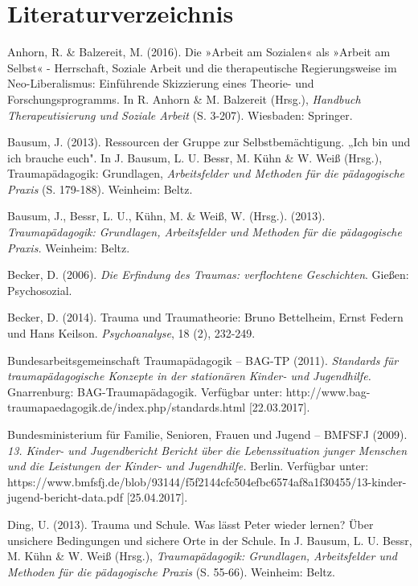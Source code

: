 \section{Literaturverzeichnis}

\setlength{\parindent}{0pt}
\hang
Anhorn, R. \& Balzereit, M. (2016). Die »Arbeit am Sozialen« als »Arbeit am Selbst« - Herrschaft, Soziale Arbeit und die therapeutische Regierungsweise im Neo-Liberalismus: Einf{\"u}hrende Skizzierung eines Theorie- und Forschungsprogramms. In R. Anhorn \& M. Balzereit (Hrsg.), \textit{Handbuch Therapeutisierung und Soziale Arbeit} (S. 3-207). Wiesbaden: Springer.

\hang
Bausum, J. (2013). Ressourcen der Gruppe zur Selbstbem{\"a}chtigung. „Ich bin und ich brauche euch". In J. Bausum, L. U. Bessr, M. Kühn \& W. Weiß (Hrsg.), Traumapädagogik: Grundlagen, \textit{Arbeitsfelder und Methoden für die pädagogische Praxis} (S. 179-188). Weinheim: Beltz.

\hang
Bausum, J., Bessr, L. U., Kühn, M. \& Weiß, W. (Hrsg.). (2013). \textit{Traumapädagogik: Grundlagen, Arbeitsfelder und Methoden für die pädagogische Praxis.} Weinheim: Beltz.

\hang
Becker, D. (2006). \textit{Die Erfindung des Traumas: verflochtene Geschichten}. Gießen: Psychosozial.

\hang
Becker, D. (2014). Trauma und Traumatheorie: Bruno Bettelheim, Ernst Federn und Hans Keilson. \textit{Psychoanalyse}, 18 (2), 232-249.

\hang
Bundesarbeitsgemeinschaft Traumap{\"a}dagogik – BAG-TP (2011). \textit{Standards für traumapädagogische Konzepte in der stationären Kinder- und Jugendhilfe.} Gnarrenburg: BAG-Traumapädagogik. Verfügbar unter: http://www.bag-traumapaedagogik.de/index.php/standards.html [22.03.2017].

\hang
Bundesministerium für Familie, Senioren, Frauen und Jugend – BMFSFJ (2009). \textit{13. Kinder- und Jugendbericht Bericht über die Lebenssituation junger Menschen und die Leistungen der Kinder- und Jugendhilfe.} Berlin. Verfügbar unter:\\ https://www.bmfsfj.de/blob/93144/f5f2144cfc504efbc6574af8a1f30455/13-kinder-jugend-bericht-data.pdf [25.04.2017].

\hang
Ding, U. (2013). Trauma und Schule. Was l{\"a}sst Peter wieder lernen? {\"U}ber unsichere Bedingungen und sichere Orte in der Schule. In J. Bausum, L. U. Bessr, M. Kühn \& W. Weiß (Hrsg.), \textit{Traumapädagogik: Grundlagen, Arbeitsfelder und Methoden für die pädagogische Praxis} (S. 55-66). Weinheim: Beltz.

